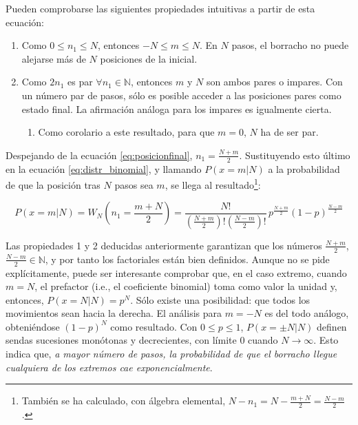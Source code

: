 Pueden comprobarse las siguientes propiedades intuitivas a partir de esta ecuación:

\begin{enumerate}
	\item Como $0 \leq n_1 \leq N$, entonces $- N \leq m \leq N$. En $N$ pasos, el borracho no puede alejarse más de $N$ posiciones de la inicial.
	\item Como $2n_1$ es par $\forall n_1 \in \mathbb N$, entonces $m$ y $N$ son ambos pares o impares. Con un número par de pasos, sólo es posible acceder a las posiciones pares como estado final. La afirmación análoga para los impares es igualmente cierta.
	\begin{enumerate}
		\item Como corolario a este resultado, para que $m = 0$, $N$ ha de ser par.
	\end{enumerate}
\end{enumerate}

Despejando de la ecuación \ref{eq:posicionfinal}, $n_1 = \frac{N+m}{2}$.  Sustituyendo esto último en la ecuación \ref{eq:distr_binomial}, y llamando $P\left(x = m | N\right)$ a la probabilidad de que la posición tras $N$ pasos sea $m$, se llega al resultado\footnote{También se ha calculado, con álgebra elemental, $N - n_1 = N - \frac{m+N}{2} = \frac{N-m}{2}$.}:

\begin{equation}
	P(x=m | N) = W_N\left(n_1 = \frac{m+N}{2}\right) = \frac{N!}{\left(\frac{N+m}{2} \right)! \left(\frac{N-m}{2} \right)!} \,p^{\frac{N+m}{2}} (1-p)^{\frac{N-m}{2}}
	\label{eq:prob_posfinal}
\end{equation}

Las propiedades 1 y 2 deducidas anteriormente garantizan que los números $\frac{N+m}{2}$, $\frac{N-m}{2} \in \mathbb N$, y por tanto los factoriales están bien definidos. Aunque no se pide explícitamente, puede ser interesante comprobar que, en el caso extremo, cuando $m = N$, el prefactor (i.e., el coeficiente binomial) toma como valor la unidad y, entonces, $P\left(x = N | N\right) = p^N$. Sólo existe una posibilidad: que todos los movimientos sean hacia la derecha. El análisis para $m = - N$ es del todo análogo, obteniéndose $(1-p)^N$ como resultado. Con $0 \leq p \leq 1$, $P(x = \pm N | N)$ definen sendas sucesiones monótonas y decrecientes, con límite 0 cuando $N \to \infty$. Esto indica que, \emph{a mayor número de pasos, la probabilidad de que el borracho llegue cualquiera de los extremos cae exponencialmente}.

